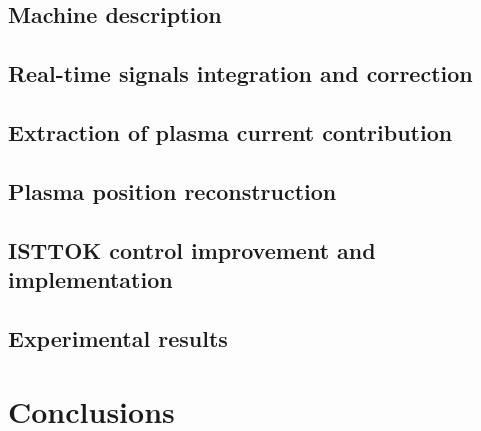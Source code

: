 \documentclass{article}
\begin{document}
\subsection{Machine description}
\subsection{Real-time signals integration and correction}
\subsection{Extraction of plasma current contribution}
\subsection{Plasma position reconstruction}
\subsection{ISTTOK control improvement and implementation}
\subsection{Experimental results}
\hfil


\section{Conclusions}
\end{document}
